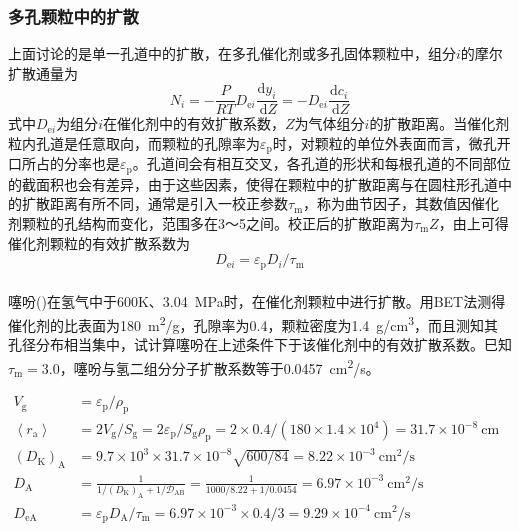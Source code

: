 \begin{frame}
    \frametitle{多孔颗粒中的扩散}

    上面讨论的是单一孔道中的扩散，在多孔催化剂或多孔固体颗粒中，组分$i$的摩尔扩散通量为
    \[
        N_{i}=-\frac{P}{R T} D_{\mathrm{e} i} \frac{\mathrm{d} y_{i}}{\mathrm{~d} Z}=-D_{\mathrm{e} i} \frac{\mathrm{d} c_{i}}{\mathrm{~d} Z} 
    \]
    式中$D_{\mathrm{e} i}$为组分$i$在催化剂中的有效扩散系数，$Z$为气体组分$i$的扩散距离。当催化剂粒内孔道是任意取向，而颗粒的孔隙率为$\varepsilon_{\mathrm{p}}$时，对颗粒的单位外表面而言，微孔开口所占的分率也是$\varepsilon_{\mathrm{p}}$。孔道间会有相互交叉，各孔道的形状和每根孔道的不同部位的截面积也会有差异，由于这些因素，使得在颗粒中的扩散距离与在圆柱形孔道中的扩散距离有所不同，通常是引入一校正参数$\tau_{\mathrm{m}}$，称为曲节因子，其数值因催化剂颗粒的孔结构而变化，范围多在3～5之间。校正后的扩散距离为$\tau_{\mathrm{m}}Z$，由上可得催化剂颗粒的有效扩散系数为
    \[
        D_{\mathrm{e} i}=\varepsilon_{\mathrm{p}} D_{i} / \tau_{\mathrm{m}}
    \]

\end{frame}


\begin{frame}[t]
    \frametitle{}

    \begin{example}
        噻吩()在氢气中于600K、\SI{3.04}{MPa}时，在催化剂颗粒中进行扩散。用BET法测得催化剂的比表面为\SI{180}{m^2/g}，孔隙率为0.4，颗粒密度为\SI{1.4}{g/cm^3}，而且测知其孔径分布相当集中，试计算噻吩在上述条件下于该催化剂中的有效扩散系数。巳知$\tau_{\mathrm{m}} = 3.0$，噻吩与氢二组分分子扩散系数等于\SI{0.0457}{cm^2/s}。
    \end{example}\pause
    $\begin{aligned}
        V_{\mathrm{g}} &=\varepsilon_{\mathrm{p}} / \rho_{\mathrm{p}} \\
        \left\langle r_{\mathrm{a}}\right\rangle &= 2V_{\mathrm{g}}/S_{\mathrm{g}} = 2 \varepsilon_{\mathrm{p}} / S_{\mathrm{g}} \rho_{\mathrm{p}}=2 \times 0.4 /(180 \times 1.4 \times 10^{4})=31.7 \times 10^{-8} \mathrm{~cm} \\
        (D_{\mathrm{K}})_{\mathrm{A}} &=9.7 \times 10^{3} \times 31.7 \times 10^{-8} \sqrt{600 / 84}=8.22 \times 10^{-3} \mathrm{~cm}^{2} / \mathrm{s} \\
        D_{\mathrm{A}} &=\frac{1}{1 /(D_{\mathrm{K}})_{\mathrm{A}}+1 / \mathscr{D}_{\mathrm{AB}}}=\frac{1}{1000 / 8.22+1 / 0.0454}=6.97 \times 10^{-3} \mathrm{~cm}^{2} / \mathrm{s} \\
        D_{\mathrm{eA}} &= \varepsilon_{\mathrm{p}} D_{\mathrm{A}}/ \tau_{\mathrm{m}}=6.97 \times 10^{-3} \times 0.4 / 3=9.29 \times 10^{-4} \mathrm{~cm}^{2} / \mathrm{s}
        \end{aligned}$

\end{frame}
